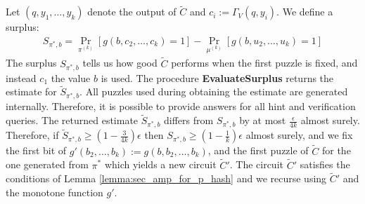 Let $(q, y_1, \dots, y_k)$ denote the output of $\widetilde{C}$ and $c_i := \Gamma_V(q, y_i)$.
We define a surplus:
\begin{align}
  \label{eq:s_pi_b}
S_{\pi^*, b} = \underset{\pi^{(k)}}{\Pr}[g(b, c_2, \dots, c_k) = 1] - \underset{\mu^{(k)}}{\Pr}[g(b, u_2, \dots, u_k) = 1]
\end{align}
The surplus $S_{\pi^*, b}$ tells us how good $\widetilde{C}$ performs when the first puzzle is fixed, and instead $c_1$ the value $b$ is used.
The procedure \textbf{EvaluateSurplus} returns the estimate for $\widetilde{S}_{\pi^*, b}$.
All puzzles used during obtaining the estimate are generated internally.
Therefore, it is possible to provide answers for all hint and verification queries.
The returned estimate $\widetilde{S}_{\pi^*,b}$ differs from $S_{\pi^*, b}$ by at most $\frac{\epsilon}{4k}$ almost surely.
Therefore, if $\widetilde{S}_{\pi^*,b} \geq (1-\frac{3}{4k})\epsilon$ then $S_{\pi^*,b} \geq (1-\frac{1}{k})\epsilon$ almost surely, and
we fix the first bit of $g'(b_2, \dots, b_k) := g(b, b_2, \dots, b_k)$, and the first puzzle of $\widetilde{C}$ for the one generated from $\pi^*$ which yields a new circuit $\widetilde{C}'$.
The circuit $\widetilde{C}'$ satisfies the conditions of Lemma \ref{lemma:sec_amp_for_p_hash}
and we recurse using $\widetilde{C}'$ and the monotone function $g'$.

